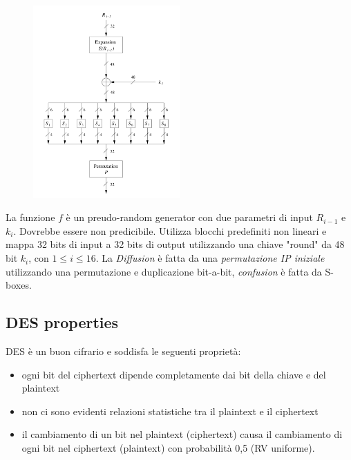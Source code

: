 \documentclass[a4paper,12pt]{article}
\begin{document}
\begin{figure}[H]
  \centering
  \includegraphics[width=0.5\textwidth]{img/round-func}
\end{figure}
La funzione $f$ è un preudo-random generator con due parametri di input $R_{i-1}$ e $k_i$. Dovrebbe essere non predicibile. Utilizza blocchi predefiniti non lineari e mappa 32 bits di input a 32 bits di output utilizzando una chiave "round" da 48 bit $k_i$, con $1 \leq i \leq 16$.
La \textit{Diffusion} è fatta da una \textit{permutazione IP iniziale} utilizzando una permutazione e duplicazione bit-a-bit, \textit{confusion} è fatta da S-boxes.

\subsection{DES properties}
DES è un buon cifrario e soddisfa le seguenti proprietà:
\begin{itemize}
	\item ogni bit del ciphertext dipende completamente dai bit della chiave e del plaintext
	\item non ci sono evidenti relazioni statistiche tra il plaintext e il ciphertext
	\item il cambiamento di un bit nel plaintext (ciphertext) causa il cambiamento di ogni bit nel ciphertext (plaintext) con probabilità 0,5 (RV uniforme).
\end{itemize} 
\end{document}
